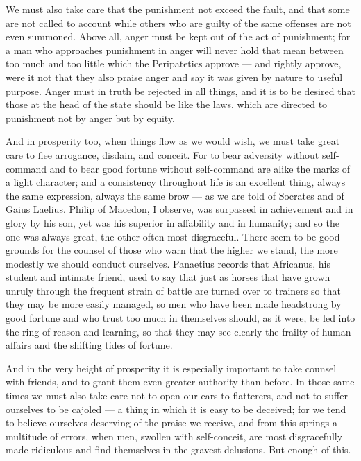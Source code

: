  We must also take care that the punishment not exceed the fault, and that some are not called to account while others who are guilty of the same offenses are not even summoned. Above all, anger must be kept out of the act of punishment; for a man who approaches punishment in anger will never hold that mean between too much and too little which the Peripatetics approve — and rightly approve, were it not that they also praise anger and say it was given by nature to useful purpose. Anger must in truth be rejected in all things, and it is to be desired that those at the head of the state should be like the laws, which are directed to punishment not by anger but by equity.

 And in prosperity too, when things flow as we would wish, we must take great care to flee arrogance, disdain, and conceit. For to bear adversity without self-command and to bear good fortune without self-command are alike the marks of a light character; and a consistency throughout life is an excellent thing, always the same expression, always the same brow — as we are told of Socrates and of Gaius Laelius. Philip of Macedon, I observe, was surpassed in achievement and in glory by his son, yet was his superior in affability and in humanity; and so the one was always great, the other often most disgraceful. There seem to be good grounds for the counsel of those who warn that the higher we stand, the more modestly we should conduct ourselves. Panaetius records that Africanus, his student and intimate friend, used to say that just as horses that have grown unruly through the frequent strain of battle are turned over to trainers so that they may be more easily managed, so men who have been made headstrong by good fortune and who trust too much in themselves should, as it were, be led into the ring of reason and learning, so that they may see clearly the frailty of human affairs and the shifting tides of fortune.

 And in the very height of prosperity it is especially important to take counsel with friends, and to grant them even greater authority than before. In those same times we must also take care not to open our ears to flatterers, and not to suffer ourselves to be cajoled — a thing in which it is easy to be deceived; for we tend to believe ourselves deserving of the praise we receive, and from this springs a multitude of errors, when men, swollen with self-conceit, are most disgracefully made ridiculous and find themselves in the gravest delusions. But enough of this.

